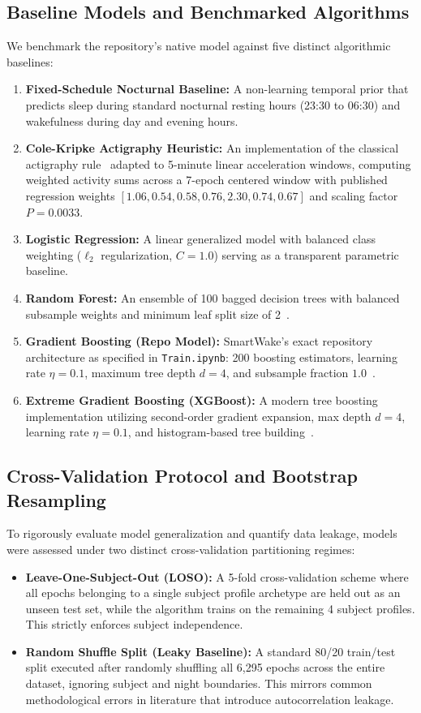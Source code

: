 \documentclass[journal,11pt,onecolumn]{IEEEtran}
\begin{document}
\subsection{Baseline Models and Benchmarked Algorithms}
We benchmark the repository's native model against five distinct algorithmic baselines:
\begin{enumerate}[leftmargin=*]
    \item \textbf{Fixed-Schedule Nocturnal Baseline:} A non-learning temporal prior that predicts sleep during standard nocturnal resting hours (23:30 to 06:30) and wakefulness during day and evening hours.
    \item \textbf{Cole-Kripke Actigraphy Heuristic:} An implementation of the classical actigraphy rule~\cite{cole1992automatic} adapted to 5-minute linear acceleration windows, computing weighted activity sums across a 7-epoch centered window with published regression weights $[1.06, 0.54, 0.58, 0.76, 2.30, 0.74, 0.67]$ and scaling factor $P = 0.0033$.
    \item \textbf{Logistic Regression:} A linear generalized model with balanced class weighting ($\ell_2$ regularization, $C=1.0$) serving as a transparent parametric baseline.
    \item \textbf{Random Forest:} An ensemble of 100 bagged decision trees with balanced subsample weights and minimum leaf split size of 2~\cite{breiman2001random}.
    \item \textbf{Gradient Boosting (Repo Model):} SmartWake's exact repository architecture as specified in \texttt{Train.ipynb}: 200 boosting estimators, learning rate $\eta = 0.1$, maximum tree depth $d = 4$, and subsample fraction $1.0$~\cite{friedman2001greedy}.
    \item \textbf{Extreme Gradient Boosting (XGBoost):} A modern tree boosting implementation utilizing second-order gradient expansion, max depth $d=4$, learning rate $\eta = 0.1$, and histogram-based tree building~\cite{chen2016xgboost}.
\end{enumerate}

\subsection{Cross-Validation Protocol and Bootstrap Resampling}
To rigorously evaluate model generalization and quantify data leakage, models were assessed under two distinct cross-validation partitioning regimes:
\begin{itemize}[leftmargin=*]
    \item \textbf{Leave-One-Subject-Out (LOSO):} A 5-fold cross-validation scheme where all epochs belonging to a single subject profile archetype are held out as an unseen test set, while the algorithm trains on the remaining 4 subject profiles. This strictly enforces subject independence.
    \item \textbf{Random Shuffle Split (Leaky Baseline):} A standard 80/20 train/test split executed after randomly shuffling all 6,295 epochs across the entire dataset, ignoring subject and night boundaries. This mirrors common methodological errors in literature that introduce autocorrelation leakage.
\end{itemize}
\end{document}
